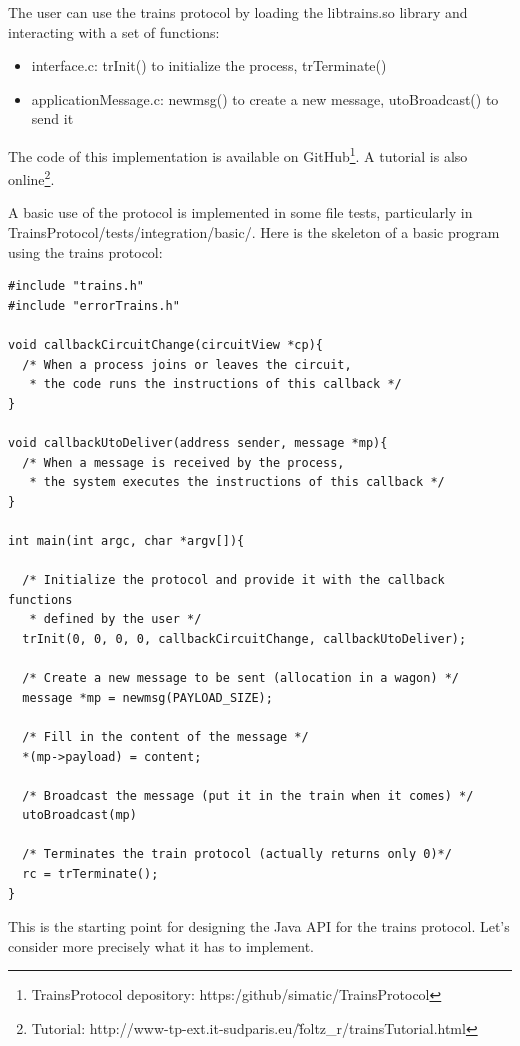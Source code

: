 \documentclass[a4paper,10pt]{report}
\begin{document}
The user can use the trains protocol by loading the libtrains.so library and interacting with a set of functions:
\begin{itemize}
  \item interface.c: trInit() to initialize the process, trTerminate()
  \item applicationMessage.c: newmsg() to create a new message, utoBroadcast() to send it\\
\end{itemize}


The code of this implementation is available on GitHub\footnote{TrainsProtocol depository: https:/github/simatic/TrainsProtocol}.
A tutorial is also online\footnote{Tutorial: http://www-tp-ext.it-sudparis.eu/\~foltz\_r/trainsTutorial.html}.

A basic use of the protocol is implemented in some file tests, particularly in TrainsProtocol/tests/integration/basic/.
Here is the skeleton of a basic program using the trains protocol:\\

\lstset{language=C}
\lstset{commentstyle=\textit} 
\begin{lstlisting}
#include "trains.h"
#include "errorTrains.h"

void callbackCircuitChange(circuitView *cp){
  /* When a process joins or leaves the circuit, 
   * the code runs the instructions of this callback */
}

void callbackUtoDeliver(address sender, message *mp){
  /* When a message is received by the process,
   * the system executes the instructions of this callback */
}

int main(int argc, char *argv[]){
  
  /* Initialize the protocol and provide it with the callback functions
   * defined by the user */
  trInit(0, 0, 0, 0, callbackCircuitChange, callbackUtoDeliver);

  /* Create a new message to be sent (allocation in a wagon) */
  message *mp = newmsg(PAYLOAD_SIZE);

  /* Fill in the content of the message */
  *(mp->payload) = content;

  /* Broadcast the message (put it in the train when it comes) */
  utoBroadcast(mp)

  /* Terminates the train protocol (actually returns only 0)*/
  rc = trTerminate();
}
\end{lstlisting} 

This is the starting point for designing the Java API for the trains protocol. Let's consider more precisely what it has to implement.
\end{document}
